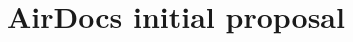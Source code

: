 \makeatletter
{}
\makeatother

\chapter{AirDocs initial proposal} \label{a:airdocs}

    \pagebreak
    \begin{figure}
        \centering 
        
    \end{figure}
    
